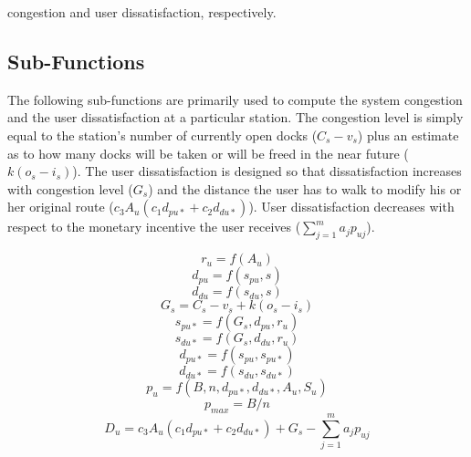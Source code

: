 \documentclass[times, 10pt,twocolumn]{article}
\begin{document}
congestion and user dissatisfaction, respectively.

\subsection{Sub-Functions}

The following sub-functions are primarily used to compute the system congestion and the user dissatisfaction at a particular station. The congestion level is simply equal to the station's number of currently open docks ($C_s - v_s$) plus an estimate as to how many docks will be taken or will be freed in the near future ($k(o_s - i_s)$). The user dissatisfaction is designed so that dissatisfaction increases with congestion level ($G_s$) and the distance the user has to walk to modify his or her original route ($c_3A_u(c_1d_{pu*} + c_2d_{du*})$). User dissatisfaction decreases with respect to the monetary incentive the user receives ($\sum_{j=1}^{m}a_jp_{uj}$).

\begin{equation}
r_u = f(A_u)
\end{equation}
\begin{equation}
d_{pu} = f(s_{pu}, s)
\end{equation}
\begin{equation}
d_{du} = f(s_{du}, s)
\end{equation}
\begin{equation}
G_s = C_s - v_s + k(o_s - i_s)
\end{equation}
\begin{equation}
s_{pu*} = f(G_s, d_{pu}, r_u)
\end{equation}
\begin{equation}
s_{du*} = f(G_s, d_{du}, r_u)
\end{equation}
\begin{equation}
d_{pu*} = f(s_{pu}, s_{pu*})
\end{equation}
\begin{equation}
d_{du*} = f(s_{du}, s_{du*})
\end{equation}
\begin{equation}
p_u = f(B, n, d_{pu*}, d_{du*}, A_u, S_u)
\end{equation}
\begin{equation}
p_{max} = B/n
\end{equation}
\begin{equation}
D_u = c_3A_u(c_1d_{pu*} + c_2d_{du*}) + G_s - \sum_{j=1}^{m}a_jp_{uj}
\end{equation}
\end{document}
